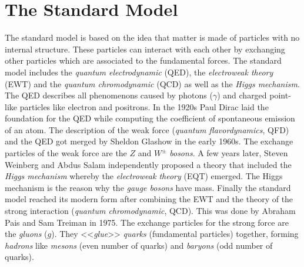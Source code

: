 \documentclass[a4paper,11pt,twosided,final,german,openbib,pdftex,listof=totoc,bibliography=totoc]{scrbook}
\begin{document}
 
\section{The Standard Model}
\label{sec:SM}

The standard model is based on the idea that matter is made of particles with no internal structure. These particles can interact with each other by exchanging other particles which are associated to the fundamental forces. The standard model includes the \textit{quantum electrodynamic} (QED), the \textit{electroweak theory} (EWT) and the \textit{quantum chromodynamic} (QCD) as well as the \textit{Higgs mechanism}.\\

The QED describes all phenomenons caused by photons ($\gamma$) and charged point-like particles like electron and positrons. In the 1920s Paul Dirac laid the foundation for the QED while computing the coefficient of spontaneous emission of an atom. The description of the weak force (\textit{quantum flavordynamics}, QFD) and the QED got merged by Sheldon Glashow in the early 1960s. The exchange particles of the weak force are the $Z$ and $W^{\pm}$ \textit{bosons}. A few years later, Steven Weinberg and Abdus Salam independently proposed a theory that included the \textit{Higgs mechanism} whereby the \textit{electroweak theory} (EQT) emerged. The Higgs mechanism is the reason why the \textit{gauge bosons} have mass.
Finally the standard model reached its modern form after combining the EWT and the theory of the strong interaction (\textit{quantum chromodynamic}, QCD). This was done by Abraham Pais and Sam Treiman in 1975. The exchange particles for the strong force are the \textit{gluons} ($g$). They <<\textit{glue}>> \textit{quarks} (fundamental particles) together, forming \textit{hadrons} like \textit{mesons} (even number of quarks) and \textit{baryons} (odd number of quarks). \cite{RiseStandard} \\ 
\end{document}
